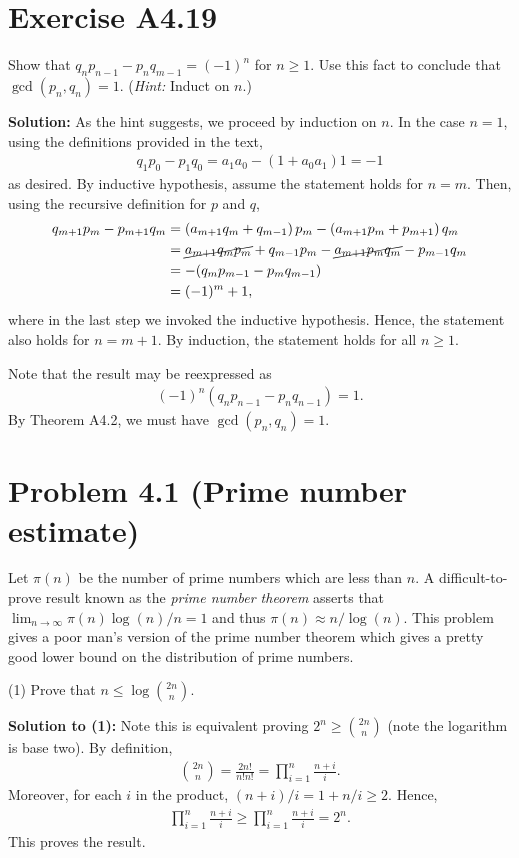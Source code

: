 \documentclass{book}
\begin{document}
\section*{Exercise A4.19}
    Show that $q_n p_{n-1}-p_n q_{m-1}=(-1)^n$ for $n\geq 1$. Use this fact to conclude that $\gcd(p_n,q_n)=1$. (\emph{Hint:} Induct on $n$.)
    
    \textbf{Solution:} As the hint suggests, we proceed by induction on $n$. In the case $n=1$, using the definitions provided in the text,
    \begin{align}
        q_1 p_0-p_1 q_0 = a_1 a_0-(1+a_0 a_1)1 = -1
    \end{align}
    as desired. By inductive hypothesis, assume the statement holds for $n=m$. Then, using the recursive definition for $p$ and $q$,
    \begin{align}
        q_{m+1}p_m - p_{m+1}q_m &= \left(a_{m+1}q_m + q_{m-1}\right)p_m-\left(a_{m+1}p_m+p_{m+1}\right)q_m \\
        &= \cancel{a_{m+1}q_m p_m} + q_{m-1}p_m-\cancel{a_{m+1}p_m q_m} -p_{m-1}q_m \\
        &=-(q_m p_{m-1}-p_m q_{m-1}) \\
        &= (-1)^m+1,
    \end{align}
    where in the last step we invoked the inductive hypothesis. Hence, the statement also holds for $n=m+1$. By induction, the statement holds for all $n\geq 1$.
    
    Note that the result may be reexpressed as 
    \begin{align}
        (-1)^n(q_n p_{n-1}-p_n q_{n-1}) = 1.
    \end{align}
    By Theorem A4.2, we must have $\gcd(p_n,q_n)=1$.

\section*{Problem 4.1 (Prime number estimate)}
    Let $\pi(n)$ be the number of prime numbers which are less than $n$. A difficult-to-prove result known as the \emph{prime number theorem} asserts that $\lim_{n\rightarrow\infty} \pi(n)\log(n)/n=1$ and thus $\pi(n) \approx n/\log(n)$. This problem gives a poor man's version of the prime number theorem which gives a pretty good lower bound on the distribution of prime numbers.
    
    (1) Prove that $n\leq \log \binom{2n}{n}$. 

    \textbf{Solution to (1):} Note this is equivalent proving $2^n \geq {\binom{2n}{n}}$ (note the logarithm is base two). By definition,
    \begin{align}
        \binom{2n}{n} = \frac{2n!}{n!n!} = \prod_{i=1}^n \frac{n+i}{i}.
    \end{align}
    Moreover, for each $i$ in the product, $(n+i)/i  = 1 + n/i \geq 2$. Hence,
    \begin{align}
        \prod_{i=1}^n \frac{n+i}{i} \geq \prod_{i=1}^n \frac{n+i}{i} = 2^n.
    \end{align}
    This proves the result.
\end{document}
